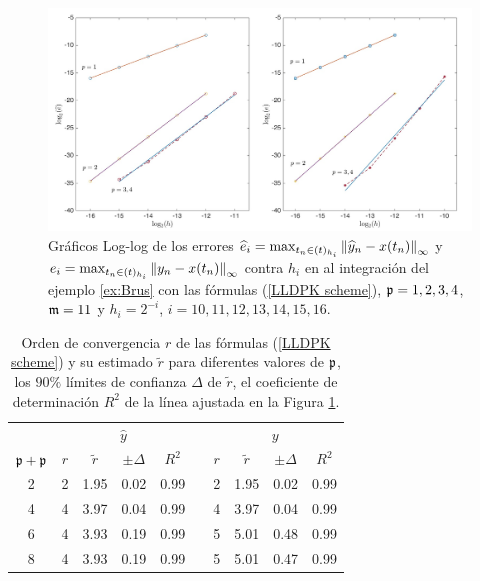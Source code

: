 \begin{figure}[htb]
	\begin{center}
		\includegraphics[scale=0.45]{Graphics/lldp/p-plots.jpg}
		\caption{Gráficos Log-log de los errores $\widehat{e}_i=\max_{t_n\in(t)_{h_i}}\left\lVert \widehat{y}_n-x(t_n) \right\rVert_\infty$ y $e_i=\max_{t_n\in(t)_{h_i}}\left\lVert y_n-x(t_n) \right\rVert_\infty$ contra $h_i$ en al integración del ejemplo \ref{ex:Brus} con las fórmulas (\ref{LLDPK scheme}), $\mathfrak{p}=1,2,3,4$, $\mathfrak{m}=11$ y $h_i=2^{-i}$, $i=10,11,12,13,14,15,16$.}
		\label{fig:num-exp-lldp-fix-step:Fig2}
	\end{center}
\end{figure}


\begin{table}[htb]
	\centering
	\caption{
		Orden de convergencia $r$ de las fórmulas (\ref{LLDPK scheme}) y su estimado  $\widetilde{r}$ para diferentes valores de $\mathfrak{p}$, los $90\%$ límites de confianza $\Delta$ de $\widetilde {r}$, el coeficiente de determinación $R^2$ de la línea ajustada en la Figura \ref{fig:num-exp-lldp-fix-step:Fig2}.}
		\begin{tabular}{ c  c c c c  c  c c c c}
			\hline
			& \multicolumn{4}{c}{$\widehat{y}$} & & \multicolumn{4}{c}{$y$} \\
			\cline{2-5} \cline{7-10}
			$\mathfrak{p}+\mathfrak{p}$ & $r$ & $\widetilde{r}$ & $\pm\varDelta$ & $R^2$ & & $r$ & $\widetilde{r}$ & $\pm\varDelta$ & $R^2$ \\
			\hline
			2 & 2 & 1.95 & 0.02 & 0.99 & & 2 & 1.95 & 0.02 & 0.99 \\
			4 & 4 & 3.97 & 0.04 & 0.99 & & 4 & 3.97 & 0.04 & 0.99 \\
			6 & 4 & 3.93 & 0.19 & 0.99 & & 5 & 5.01 & 0.48 & 0.99 \\
			8 & 4 & 3.93 & 0.19 & 0.99 & & 5 & 5.01 & 0.47 & 0.99 \\
			\hline
		\end{tabular}
	\label{tab:num-exp-lldp-fix-step:porders}
\end{table}

